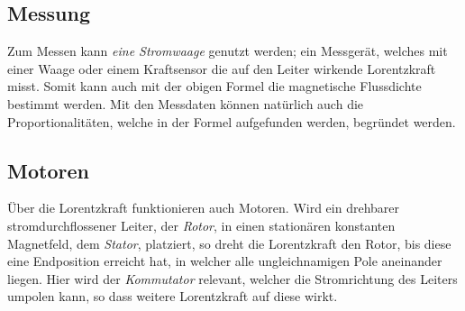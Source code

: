 \documentclass{article}
\begin{document}
\subsection{Messung} 
\begin{minipage}{\dimexpr\linewidth-5cm} 
Zum Messen kann \emph{eine Stromwaage} genutzt werden; ein Messgerät, welches mit einer Waage oder einem Kraftsensor die auf den Leiter wirkende Lorentzkraft misst. Somit kann auch mit der obigen Formel die magnetische Flussdichte bestimmt werden. \newline
Mit den Messdaten können natürlich auch die Proportionalitäten, welche in der Formel aufgefunden werden, begründet werden.
\end{minipage} 
\hfill
\begin{minipage}{5cm}
 \center
\end{minipage} 
 
\subsection{Motoren}
Über die Lorentzkraft funktionieren auch Motoren. Wird ein drehbarer stromdurchflossener Leiter, der \emph{Rotor}, in einen stationären konstanten Magnetfeld, dem \emph{Stator}, platziert, so dreht die Lorentzkraft den Rotor, bis diese eine Endposition erreicht hat, in welcher alle ungleichnamigen Pole aneinander liegen. Hier wird der \emph{Kommutator} relevant, welcher die Stromrichtung des Leiters umpolen kann, so dass weitere Lorentzkraft auf diese wirkt.
 
\end{document}
